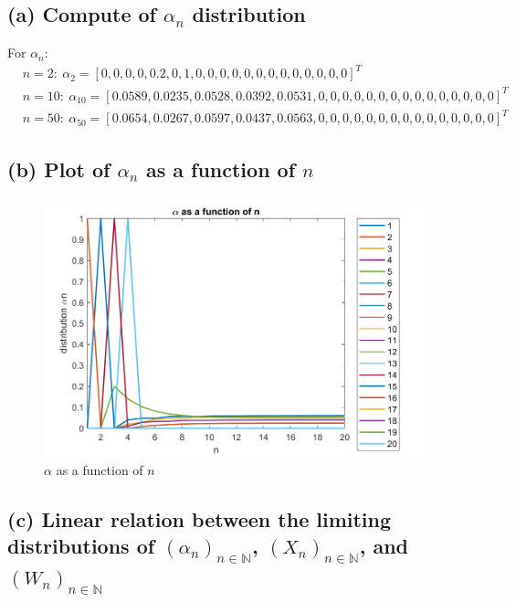 \documentclass{article}
\begin{document}
    \subsection*{(a)  Compute of \( \alpha_n \) distribution }
    For \( \alpha_n \):
    \[
        \begin{aligned}
            &n = 2: \ \alpha_2 = [0, 0, 0, 0, 0.2, 0, 1, 0, 0, 0, 0, 0, 0, 0, 0, 0, 0, 0, 0, 0]^{T} \\
            &n = 10: \ \alpha_{10} = [0.0589, 0.0235, 0.0528, 0.0392, 0.0531, 0, 0, 0, 0, 0, 0, 0, 0, 0, 0, 0, 0, 0, 0, 0]^{T}\\
            &n = 50: \ \alpha_{50} = [0.0654, 0.0267, 0.0597, 0.0437, 0.0563, 0, 0, 0, 0, 0, 0, 0, 0, 0, 0, 0, 0, 0, 0, 0]^{T}
        \end{aligned}
    \]
    \subsection*{(b) Plot of \( \alpha_n \) as a function of \( n \)}
    \begin{figure}[h]
        \centering
        \includegraphics[width=0.7\linewidth]{plot_alpha_n.png}
        \caption{\label{fig:evo} $\alpha$ as a function of $n$}
    \end{figure}
    \subsection*{(c) Linear relation between the limiting distributions of $(\alpha_n)_{n \in \mathbb{N}}$, $(X_n)_{n \in \mathbb{N}}$, and $(W_n)_{n \in \mathbb{N}}$}
\end{document}
